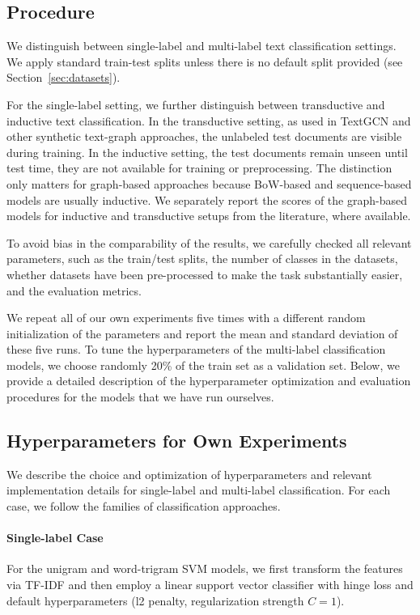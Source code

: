 \subsection{Procedure}

We distinguish between single-label and multi-label text classification settings.
We apply standard train-test splits unless there is no default split provided (see Section~\ref{sec:datasets}).

For the single-label setting, we further distinguish between transductive and inductive text classification.
In the transductive setting, as used in TextGCN and other synthetic text-graph approaches, the unlabeled test documents are visible during training.  In the inductive setting, the test documents remain unseen until test time, \ie they are not available for training or preprocessing. The distinction only matters for graph-based approaches because BoW-based and sequence-based models are usually inductive.
We separately report the scores of the graph-based models for inductive and transductive setups from the literature, where available.

To avoid bias in the comparability of the results, we carefully checked all relevant parameters, such as the train/test splits, the number of classes in the datasets, whether datasets have been pre-processed to make the task substantially easier, and the evaluation metrics. 

We repeat all of our own experiments five times with a different random initialization of the parameters and report the mean and standard deviation of these five runs.
To tune the hyperparameters of the multi-label classification models, we choose randomly 20\% of the train set as a validation set. 
Below, we provide a detailed description of the hyperparameter optimization and evaluation procedures for the models that we have run ourselves.

\subsection{Hyperparameters for Own Experiments}

We describe the choice and optimization of hyperparameters and relevant implementation details for single-label and multi-label classification.
For each case, we follow the families of classification approaches.

\paragraph{Single-label Case}
For the unigram and word-trigram SVM models, we first transform the features via TF-IDF and then employ a linear support vector classifier with hinge loss and default hyperparameters (l2 penalty, regularization strength $C=1$).

